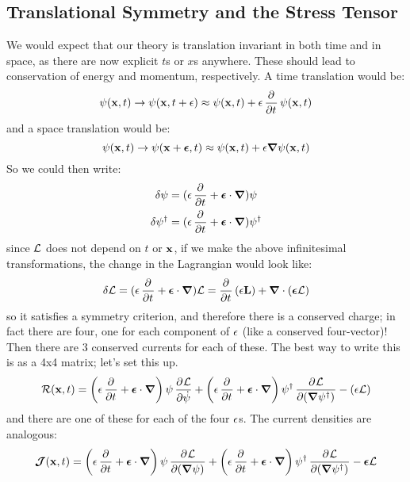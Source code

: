 \subsection{Translational Symmetry and the Stress Tensor}
We would expect that our theory is translation invariant in both time and in space, as there are now explicit $t$s or $x$s anywhere. These should lead to conservation of energy and momentum, respectively. A time translation would be:
\begin{equation}
    \psi(\v{x}, t) \to \psi(\v{x}, t + \e) \approx \psi(\v{x}, t) + \e\dpd{}{t}\psi(\v{x}, t)
\end{equation}
and a space translation would be:
\begin{equation}
    \psi(\v{x}, t) \to \psi(\v{x} + \gv{\e}, t) \approx \psi(\v{x}, t) + \e\nabla \psi(\v{x}, t)
\end{equation}
So we could then write:
\begin{equation}
    \begin{split}
        \delta \psi &= (\e\dpd{}{t} + \gv{\e} \cdot \nabla)\psi
        \\ \delta \psi^\dag &= (\e\dpd{}{t} + \gv{\e} \cdot \nabla)\psi^\dag
    \end{split}
\end{equation}
since $\mathcal{L}$ does not depend on $t$ or $\mathbf{x}$, if we make the above infinitesimal transformations, the change in the Lagrangian would look like:
\begin{equation}
    \delta \L = (\e\dpd{}{t} + \gv{\e} \cdot \nabla)\L = \dpd{}{t}(\e\v{L}) + \nabla \cdot (\gv{\e}\L)
\end{equation}
so it satisfies a symmetry criterion, and therefore there is a conserved charge; in fact there are four, one for each component of $\epsilon$ (like a conserved four-vector)! Then there are 3 conserved currents for each of these. The best way to write this is as a 4x4 matrix; let's set this up.
\begin{equation}
    \mathcal{R}(\v{x}, t) = \left(\e\dpd{}{t} + \gv{\e} \cdot \nabla\right) \psi \dpd{\L}{\dot{\psi}} + \left(\e\dpd{}{t} + \gv{\e} \cdot \nabla\right)\psi^\dag \dpd{\L}{(\nabla \psi^\dag)} - (\e\L)
\end{equation}
and there are one of these for each of the four $\epsilon$s. The current densities are analogous:
\begin{equation}
    \gv{\mathcal{J}}(\v{x}, t) = \left(\e\dpd{}{t} + \gv{\e}\cdot\nabla\right)\psi\dpd{\L}{(\nabla \psi)} + \left(\e\dpd{}{t} + \gv{\e}\cdot\nabla\right)\psi^\dag \dpd{\L}{(\nabla \psi^\dag)} - \gv{\e}\L
\end{equation}
